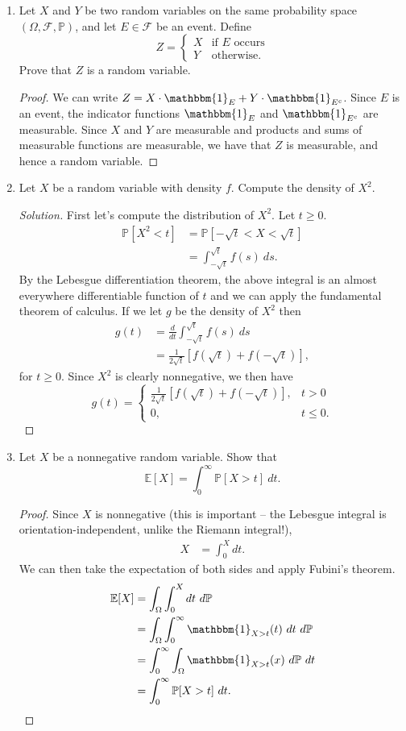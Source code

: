 \documentclass[11pt,letterpaper]{report}
\newcommand{\mcal}[1]{\mathcal{#1}}
\newcommand{\E}{\mathbb{E}}
\newcommand{\Prob}{\mathbb{P}}
\newcommand{\ind}{\mathbbm{1}}
\newenvironment{solution}
{\begin{proof}[Solution]}
{\end{proof}}
\begin{document}
\begin{enumerate}
	\item Let $X$ and $Y$ be two random variables on the same probability space $(\Omega, \mcal{F}, \Prob)$, and let $E\in \mcal{F}$ be an event. Define
	\[
	Z = \begin{cases}
		X&\text{if }E\text{ occurs}\\
		Y&\text{otherwise.}
	\end{cases}
	\]
	Prove that $Z$ is a random variable.
	\begin{proof}
		We can write $Z = X\cdot \ind_E + Y\cdot \ind_{E^c}$. Since $E$ is an event, the indicator functions $\ind_E$ and $\ind_{E^c}$ are measurable. Since $X$ and $Y$ are measurable and products and sums of measurable functions are measurable, we have that $Z$ is measurable, and hence a random variable.
	\end{proof}

	\item Let $X$ be a random variable with density $f$. Compute the density of $X^2$.
	\begin{solution}
		First let's compute the distribution of $X^2$. Let $t\geq 0$.
		\begin{align*}
			\Prob[X^2<t] &= \Prob[-\sqrt{t}<X<\sqrt{t}]\\
			&= \int_{-\sqrt{t}}^{\sqrt{t}}f(s)\ ds.
		\end{align*}
		By the Lebesgue differentiation theorem, the above integral is an almost everywhere differentiable function of $t$ and we can apply the fundamental theorem of calculus. If we let $g$ be the density of $X^2$ then
		\begin{align*}
			g(t) &= \frac{d}{dt}\int_{-\sqrt{t}}^{\sqrt{t}}f(s)\ ds\\
			&= \frac{1}{2\sqrt{t}}[f(\sqrt{t}) + f(-\sqrt{t})],
		\end{align*}
		for $t\geq 0$. Since $X^2$ is clearly nonnegative, we then have
		\[
		g(t) = \begin{cases}
			\frac{1}{2\sqrt{t}}[f(\sqrt{t})+f(-\sqrt{t})],&t>0\\
			0,&t\leq 0.
		\end{cases}
		\]
	\end{solution}

	\item Let $X$ be a nonnegative random variable. Show that
	\[
	\E[X] = \int_0^\infty \Prob[X>t]\ dt.
	\]
	\begin{proof}
		Since $X$ is nonnegative (this is important -- the Lebesgue integral is orientation-independent, unlike the Riemann integral!),
		\begin{align*}
			X &= \int_0^Xdt.
		\end{align*}
		We can then take the expectation of both sides and apply Fubini's theorem.
		\begin{align*}
			\E[X] &= \int_\Omega\int_0^Xdt\ d\Prob\\
			&= \int_\Omega\int_0^\infty \ind_{X>t}(t)\ dt\ d\Prob\\
	 		&= \int_0^\infty \int_\Omega\ind_{X>t}(x)\ d\Prob\ dt\\
			&= \int_0^\infty \Prob[X>t]\ dt.
		\end{align*}
	\end{proof}


\end{enumerate}
\end{document}
